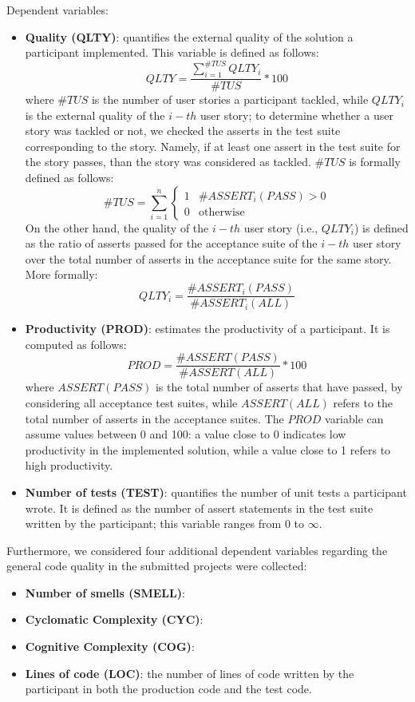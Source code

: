 Dependent variables:
\begin{itemize}
    \item \textbf{Quality (QLTY)}: quantifies the external quality of the solution a participant implemented. This variable is defined as follows: 
        \[
            QLTY = \frac{\sum_{i=1}^{\#TUS} QLTY_i}{\#TUS} * 100 
        \]
    where $\#TUS$ is the number of user stories a participant tackled, while $QLTY_i$ is the external quality of the $i-th$ user story; to determine whether a user story was tackled or not, we checked the asserts in the test suite corresponding to the story. Namely, if at least one assert in the test suite for the story passes, than the story was considered as tackled. $\#TUS$ is formally defined as follows:
        \[
            \#TUS = \sum_{i=1}^{n} 
                \begin{cases}
                    1 & \text{$\#ASSERT_i(PASS) > 0$}\\
                    0 & \text{otherwise}
                \end{cases}
        \]
    On the other hand, the quality of the $i-th$ user story (i.e., $QLTY_i$) is defined as the ratio of asserts passed for the acceptance suite of the $i-th$ user story over the total number of asserts in the acceptance suite for the same story. More formally:
        \[
            QLTY_i = \frac{\#ASSERT_i(PASS)}{\#ASSERT_i(ALL)}
        \]
    \item \textbf{Productivity (PROD)}: estimates the productivity of a participant. It is computed as follows:
        \[
            PROD = \frac{\#ASSERT(PASS)}{\#ASSERT(ALL)} * 100
        \]
    where $ASSERT(PASS)$ is the total number of asserts that have passed, by considering all acceptance test suites, while $ASSERT(ALL)$ refers to the total number of asserts in the acceptance suites. The $PROD$ variable can assume values between 0 and 100: a value close to 0 indicates low productivity in the implemented solution, while a value close to 1 refers to high productivity.
    \item \textbf{Number of tests (TEST)}: quantifies the number of unit tests a participant wrote. It is defined as the number of assert statements in the test suite written by the participant; this variable ranges from 0 to $\infty$.
\end{itemize}


Furthermore, we considered four additional dependent variables regarding the general code quality in the submitted projects were collected:
\begin{itemize}
    \item \textbf{Number of smells (SMELL)}:
    \item \textbf{Cyclomatic Complexity (CYC)}:
    \item \textbf{Cognitive Complexity (COG)}:
    \item \textbf{Lines of code (LOC)}: the number of lines of code written by the participant in both the production code and the test code.
\end{itemize}



